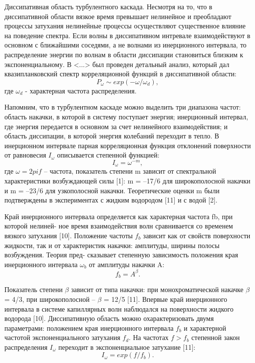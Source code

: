 Диссипативная область турбулентного каскада.
Несмотря на то, что в диссипативной области вязкое время превышает нелинейное и преобладают процессы затухания нелинейные процессы осуществляют существенное влияние на поведение спектра. Если волны в диссипативном интревале взаимодействуют в основном с ближайшими соседями, а не волнами из инерционного интервала, то распределение энергии по волнам в области диссипации становиться близким к экспоненциальному. В <...> был проведен детальный анализ, который дал квазипланковский спектр корреляционной функций в диссипативной области:
\begin{equation}
P_\omega \sim exp(-\omega/\omega_d),
\end{equation}
где $\omega_d$ - характерная частота распределения.


Напомним, что в турбулентном каскаде можно выделить три диапазона частот: область накачки, в которой в систему поступает энергия; инерционный интервал, где энергия передается в основном за счет нелинейного взаимодействия; и область диссипации, в которой энергия колебаний переходит в тепло. В инерционном интервале парная корреляционная функция отклонений поверхности от равновесия $I_\omega$ описывается степенной функцией:
\begin{equation}
I_\omega = \omega^{-m},
\end{equation}
где $\omega = 2 pi f$ – частота, показатель степени m зависит от спектральной характеристики возбуждающей силы [1]: m = –17/6 для широкополосной накачки и m = –23/6 для узкополосной накачки. Теоретические оценки m были подтверждены в экспериментах с жидким водородом [11] и с водой [2].

Край инерционного интервала определяется как характерная частота fb, при которой нелиней- ное время взаимодействия волн сравнивается со временем вязкого затухания [10]. Положение частоты $f_b$ зависит как от свойств поверхности жидкости, так и от характеристик накачки: амплитуды, ширины полосы возбуждения. Теория пред- сказывает степенную зависимость положения края инерционного интервала $\omega_b$ от амплитуды накачки A:
\begin{equation}
f_b = A^{\beta}.
\end{equation}

Показатель степени $\beta$ зависит от типа накачки: при монохроматической накачке $\beta$ = 4/3, при широкополосной – $\beta$ = 12/5 [11]. Впервые край инерционного интервала в системе капиллярных волн наблюдался на поверхности жидкого водорода [10].
Диссипативную область можно охарактеризовать двумя параметрами: положением края инерционного интервала $f_b$ и характерной частотой экспоненциального затухания $f_d$. На частотах $f > f_b$ степенной закон распределения $I_\omega$ переходит в экспоненциальное затухание [11]:
\begin{equation}
I_\omega = exp(f/f_b).
\end{equation}


